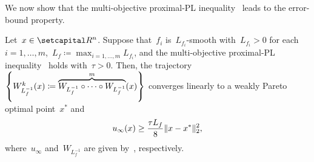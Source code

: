 \documentclass[../main]{subfiles}
\begin{document}
We now show that the multi-objective proximal-PL inequality~ leads to the error-bound property.
\begin{theorem} 
    Let~$x \in \setR^n$.
    Suppose that~$f_i$ is~$L_{f_i}$-smooth with~$L_{f_i} > 0$ for each~$i = 1, \dots, m$,~$L_f \coloneqq \max_{i = 1, \dots, m} L_{f_i}$, and the multi-objective proximal-PL inequality~ holds with~$\tau > 0$.
    Then, the trajectory~$\set*{W_{L_f^{-1}}^k(x) \coloneqq \overbrace{W_{L_f^{-1}} \circ \dots \circ W_{L_f^{-1}}}^{m}(x)}$ converges linearly to a weakly Pareto optimal point~$x^*$ and
    \begin{equation}
        u_\infty(x) \ge \frac{\tau L_f}{8} \norm{x - x^*}_2^2
    ,\end{equation}
    where~$u_\infty$ and~$W_{L_f^{-1}}$ are given by~, respectively.
\end{theorem}
\end{document}
